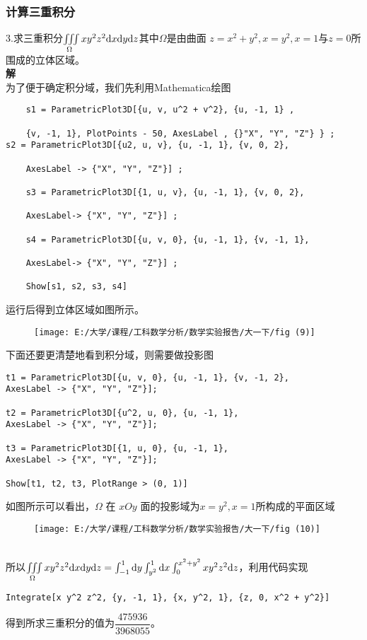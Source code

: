 \documentclass{ctexart}
\begin{document}
\subsubsection{计算三重积分}
\noindent3.求三重积分$\iiint \limits_{\Omega}xy^2z^2 \mathrm{d} x\mathrm{d} y \mathrm{d} z$其中$\Omega$是由曲面 $z = x^2 + y^2,x = y^2,x = 1与 z = 0$所围成的立体区域。\\
\textbf{解}\\
为了便于确定积分域，我们先利用Mathematica绘图
\begin{lstlisting}
	s1 = ParametricPlot3D[{u, v, u^2 + v^2}, {u, -1, 1} ,
	
	{v, -1, 1}, PlotPoints - 50, AxesLabel , {}"X", "Y", "Z"} } ;
s2 = ParametricPlot3D[{u2, u, v}, {u, -1, 1}, {v, 0, 2},
	
	AxesLabel -> {"X", "Y", "Z"}] ;
	
	s3 = ParametricPlot3D[{1, u, v}, {u, -1, 1}, {v, 0, 2},
	
	AxesLabel-> {"X", "Y", "Z"}] ;
	
	s4 = ParametricPlot3D[{u, v, 0}, {u, -1, 1}, {v, -1, 1},
	
	AxesLabel-> {"X", "Y", "Z"}] ;
	
	Show[s1, s2, s3, s4]
\end{lstlisting}
运行后得到立体区域如图所示。\\
\begin{figure}[h]
	\centering
	\texttt{[image: E:/大学/课程/工科数学分析/数学实验报告/大一下/fig (9)]}
\end{figure}

下面还要更清楚地看到积分域，则需要做投影图
\begin{lstlisting}
t1 = ParametricPlot3D[{u, v, 0}, {u, -1, 1}, {v, -1, 2}, 
AxesLabel -> {"X", "Y", "Z"}];

t2 = ParametricPlot3D[{u^2, u, 0}, {u, -1, 1}, 
AxesLabel -> {"X", "Y", "Z"}];

t3 = ParametricPlot3D[{1, u, 0}, {u, -1, 1}, 
AxesLabel -> {"X", "Y", "Z"}];

Show[t1, t2, t3, PlotRange > (0, 1)]
\end{lstlisting}
如图所示可以看出，$\Omega$ 在 $xOy$ 面的投影域为$ x = y^2,x = 1$所构成的平面区域\\
\begin{figure}
\centering
\texttt{[image: E:/大学/课程/工科数学分析/数学实验报告/大一下/fig (10)]}
\end{figure}\\
所以$\iiint \limits_{\Omega}xy^2z^2 \mathrm{d} x\mathrm{d} y \mathrm{d} z=\int_{-1}^{1}\mathrm{d} y\int_{y^2}^{1}\mathrm{d} x\int_{0}^{x^2+y^2}xy^2z^2 \mathrm{d} z$，利用代码实现
\begin{lstlisting}
Integrate[x y^2 z^2, {y, -1, 1}, {x, y^2, 1}, {z, 0, x^2 + y^2}]
\end{lstlisting}
得到所求三重积分的值为$\dfrac{475936}{3968055}$。
\end{document}
